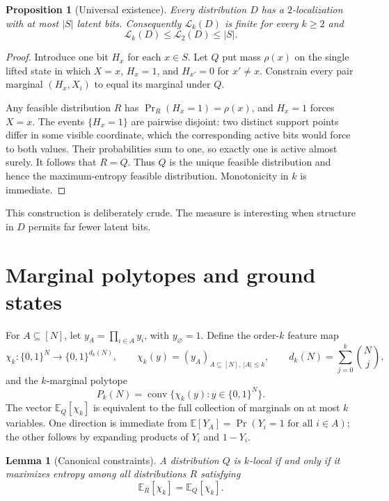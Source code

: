 \documentclass{article}
\newcommand{\LC}{\mathcal{L}}
\newcommand{\E}{\mathbb{E}}
\newcommand{\bits}{\{0,1\}}
\newtheorem{lemma}{Lemma}
\newtheorem{proposition}{Proposition}
\begin{document}
\begin{proposition}[Universal existence]\label{prop:existence}
Every distribution $D$ has a $2$-localization with at most $|S|$ latent bits.
Consequently $\LC_k(D)$ is finite for every $k\ge2$ and
\[
  \LC_k(D)\le \LC_2(D)\le |S|.
\]
\end{proposition}

\begin{proof}
Introduce one bit $H_x$ for each $x\in S$.  Let $Q$ put mass $\rho(x)$ on the
single lifted state in which $X=x$, $H_x=1$, and $H_{x'}=0$ for $x'\ne x$.
Constrain every pair marginal $(H_x,X_i)$ to equal its marginal under $Q$.

Any feasible distribution $R$ has $\Pr_R(H_x=1)=\rho(x)$, and $H_x=1$ forces
$X=x$.  The events $\{H_x=1\}$ are pairwise disjoint: two distinct support
points differ in some visible coordinate, which the corresponding active bits
would force to both values.  Their probabilities sum to one, so exactly one is
active almost surely.  It follows that $R=Q$.  Thus $Q$ is the unique feasible
distribution and hence the maximum-entropy feasible distribution.  Monotonicity
in $k$ is immediate.
\end{proof}

This construction is deliberately crude.  The measure is interesting when
structure in $D$ permits far fewer latent bits.

\section{Marginal polytopes and ground states}\label{sec:polytopes}

For $A\subseteq[N]$, let $y_A=\prod_{i\in A}y_i$, with $y_\varnothing=1$.
Define the order-$k$ feature map
\[
  \chi_k:\bits^N\longrightarrow\bits^{d_k(N)},
  \qquad
  \chi_k(y)=(y_A)_{A\subseteq[N],\ |A|\le k},
  \qquad
  d_k(N)=\sum_{j=0}^k\binom Nj,
\]
and the $k$-marginal polytope
\[
  P_k(N)=\operatorname{conv}\{\chi_k(y):y\in\bits^N\}.
\]
The vector $\E_Q[\chi_k]$ is equivalent to the full collection of marginals on
at most $k$ variables.  One direction is immediate from
$\E[Y_A]=\Pr(Y_i=1\text{ for all }i\in A)$; the other follows by expanding
products of $Y_i$ and $1-Y_i$.

\begin{lemma}[Canonical constraints]\label{lem:canonical}
A distribution $Q$ is $k$-local if and only if it maximizes entropy among all
distributions $R$ satisfying
\[
  \E_R[\chi_k]=\E_Q[\chi_k].
\]
\end{lemma}
\end{document}
